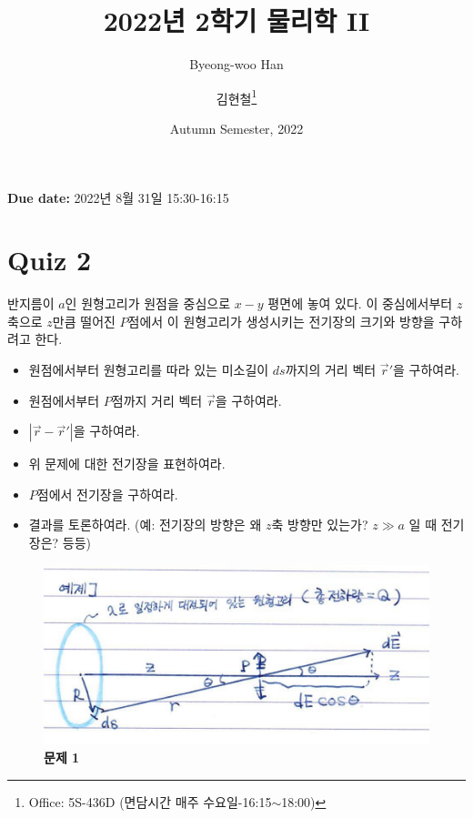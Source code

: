 \documentclass[tightenlines,floatfix,nofootinbib,superscriptaddress,fleqn]{revtex4}
\begin{document}
\title{\Large 2022년 2학기 물리학 II}
\author{Byeong-woo Han}
\author{김현철\footnote{Office: 5S-436D (면담시간 매주
    수요일-16:15$\sim$18:00)}} 
\date{Autumn Semester, 2022}

\maketitle

{\color{red} {\bf Due date:} 2022년 8월 31일  15:30-16:15 }
\vspace{1.cm}

\section*{\large Quiz 2}
반지름이 $a$인 원형고리가 원점을 중심으로 $x-y$ 평면에 놓여 있다.  
이 중심에서부터 $z$축으로 $z$만큼 떨어진 $P$점에서 이 원형고리가
생성시키는 전기장의 크기와 방향을 구하려고 한다.
\begin{itemize}
\item 원점에서부터 원형고리를 따라 있는 미소길이 $ds$까지의 거리 벡터
  $\vec{r}'$을 구하여라. 
\item 원점에서부터 $P$점까지 거리 벡터 $\vec{r}$을 구하여라.
\item $|\vec{r}-\vec{r}'|$을 구하여라. 
\item 위 문제에 대한 전기장을 표현하여라. 
\item $P$점에서 전기장을 구하여라. 
\item 결과를 토론하여라. (예: 전기장의 방향은 왜 $z$축 방향만 있는가?
  $z\gg a$ 일 때 전기장은? 등등)  
\end{itemize}
\vspace{1.cm}
 \begin{figure}[htp]
   \centering
   \includegraphics[scale=1]{problem 1.png}
   \caption{\textbf{문제 1}}
   \label{fig:1}
 \end{figure}
\end{document}
